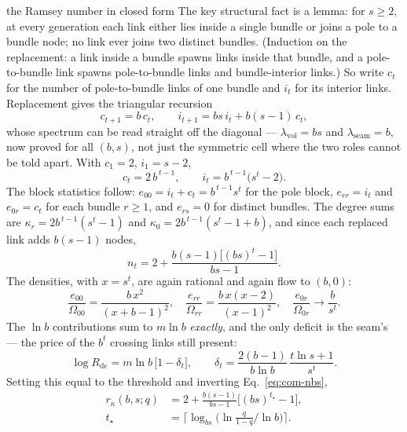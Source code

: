 \begin{calculation}{the Ramsey number in closed form}
The key structural fact is a lemma: for $s\ge2$, at every generation each link
either lies inside a single bundle or joins a pole to a bundle node; no link ever
joins two distinct bundles. (Induction on the replacement: a link inside a bundle
spawns links inside that bundle, and a pole-to-bundle link spawns pole-to-bundle
links and bundle-interior links.) So write $c_t$ for the number of pole-to-bundle
links of one bundle and $i_t$ for its interior links. Replacement gives the
triangular recursion
\begin{equation}
  c_{t+1} = b\,c_t, \qquad i_{t+1} = bs\,i_t + b(s-1)\,c_t,
  \label{eq:com-recbs}
\end{equation}
whose spectrum can be read straight off the diagonal --- $\lambda_{\mathrm{vol}}=bs$
and $\lambda_{\mathrm{seam}}=b$, now proved for all $(b,s)$, not just the symmetric
cell where the two roles cannot be told apart. With $c_1=2$, $i_1=s-2$,
\begin{equation}
  c_t = 2\,b^{\,t-1}, \qquad i_t = b^{\,t-1}\big(s^t-2\big).
  \label{eq:com-icbs}
\end{equation}
The block statistics follow: $e_{00}=i_t+c_t=b^{\,t-1}s^t$ for the pole block,
$e_{rr}=i_t$ and $e_{0r}=c_t$ for each bundle $r\ge1$, and $e_{rs}=0$ for distinct
bundles. The degree sums are $\kappa_r=2b^{\,t-1}(s^t{-}1)$ and
$\kappa_0=2b^{\,t-1}(s^t{-}1{+}b)$, and since each replaced link adds $b(s{-}1)$
nodes,
\begin{equation}
  n_t = 2 + \frac{b(s{-}1)\big[(bs)^t-1\big]}{bs-1}.
  \label{eq:com-nbs}
\end{equation}
The densities, with $x=s^t$, are again rational and again flow to $(b,0)$:
\begin{equation}
  \frac{e_{00}}{\Omega_{00}} = \frac{b\,x^2}{(x{+}b{-}1)^2},
  \quad
  \frac{e_{rr}}{\Omega_{rr}} = \frac{b\,x(x{-}2)}{(x{-}1)^2},
  \quad
  \frac{e_{0r}}{\Omega_{0r}} \to \frac{b}{s^t}.
  \label{eq:com-ratiosbs}
\end{equation}
The $\ln b$ contributions sum to $m\ln b$ \emph{exactly}, and the only deficit is
the seam's --- the price of the $b^t$ crossing links still present:
\begin{equation}
  \log R_{\mathrm{dc}} = m\ln b\,\big[1-\delta_t\big],
  \qquad
  \delta_t = \frac{2(b{-}1)}{b\ln b}\,\frac{t\ln s+1}{s^{t}} .
  \label{eq:com-delta}
\end{equation}
Setting this equal to the threshold and inverting Eq.~\eqref{eq:com-nbs},
\begin{equation}
\begin{aligned}
  r_\kappa(b,s;q) &= 2 + \frac{b(s{-}1)}{bs-1}\Big[(bs)^{t_\star}-1\Big], \\
  t_\star &= \Big\lceil \log_{bs}\Big(\ln\tfrac{q}{1-q}\Big/\ln b\Big) \Big\rceil .
\end{aligned}
\label{eq:com-rkbs}
\end{equation}
\end{calculation}

